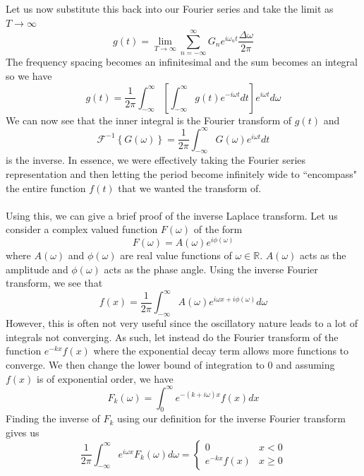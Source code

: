 \documentclass{report}
\theoremstyle{definition}
\theoremstyle{remark}
\newcommand{\ift}[1]{\mathscr{F}^{-1} \left\{ #1 \right\}}
\newcommand{\R}{\mathbb{R}}
\begin{document}
Let us now substitute this back into our Fourier series and take the limit as $T\rightarrow \infty$ 
\begin{equation*}
    g(t) =\lim_{T\rightarrow \infty} \sum^{\infty}_{n=-\infty}G_ne^{i\omega_nt}\frac{\Delta \omega}{2\pi}
\end{equation*}
The frequency spacing becomes an infinitesimal and the sum becomes an integral so we have 
\begin{equation*}
    g(t) = \frac{1}{2\pi}\int^\infty_{-\infty} \left[ \int^\infty_{-\infty}g(t)e^{-i\omega t}dt\right] e^{i\omega t}d\omega
\end{equation*}
We can now see that the inner integral is the Fourier transform of $g(t)$ and 
\begin{equation*}
    \ift{G(\omega)} = \frac{1}{2\pi}\int^\infty_{-\infty}G(\omega)e^{i\omega t}dt
\end{equation*}
is the inverse. In essence, we were effectively taking the Fourier series representation and then letting the period become infinitely wide to ``encompass" the entire function $f(t)$ that we wanted the transform of. \\\\
Using this, we can give a brief proof of the inverse Laplace transform. Let us consider a complex valued function $F(\omega)$ of the form 
\begin{equation*}
    F(\omega) = A(\omega)e^{i\phi(\omega)}
\end{equation*}
where $A(\omega)$ and $\phi(\omega)$ are real value functions of $\omega \in \R$. $A(\omega)$ acts as the amplitude and $\phi(\omega)$ acts as the phase angle. Using the inverse Fourier transform, we see that 
\begin{equation*}
    f(x)=\frac{1}{2\pi}\int^\infty_{-\infty}A(\omega)e^{i\omega x+i\phi(\omega)}d\omega
\end{equation*}
However, this is often not very useful since the oscillatory nature leads to a lot of integrals not converging. As such, let instead do the Fourier transform of the function $e^{-kx}f(x)$ where the exponential decay term allows more functions to converge. We then change the lower bound of integration to 0 and assuming $f(x)$ is of exponential order, we have 
\begin{equation*}
    F_k(\omega) = \int^\infty_0e^{-(k+i\omega)x}f(x)dx
\end{equation*}
Finding the inverse of $F_k$ using our definition for the inverse Fourier transform gives us 
\begin{equation*}
    \frac{1}{2\pi}\int^\infty_{-\infty}e^{i\omega x}F_k(\omega)d \omega = \begin{cases}
        0 &x<0 \\e^{-kx}f(x)&x\geq 0
    \end{cases}
\end{equation*}
\end{document}
